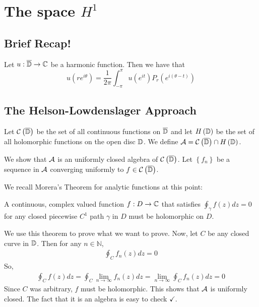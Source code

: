 \chapter{The space \texorpdfstring{$H^1$}{}}

\section{Brief Recap!}
\begin{theorem}
    Let $u : \overline{\mathbb D} \to \mathbb C$ be a harmonic function. Then we have that
    \begin{equation*}
	u\left( re^{i\theta} \right) = \frac{1}{2\pi} \int_{-\pi}^{\pi} u\left( e^{it} \right) P_{r} \left( e^{i\left( \theta-t \right)} \right)
    \end{equation*}
    \label{thm:Poisson-Integral-Formula}
\end{theorem}

\section{The Helson-Lowdenslager Approach}
Let ${\cal C} \left( \overline {\mathbb D} \right)$ be the set of all continuous functions on $\overline{\mathbb D}$ and let $H\left( \mathbb D \right)$ be the set of all holomorphic functions on the open disc $\mathbb D$. We define ${\cal A} ={\cal C} \left( \overline{ \mathbb D } \right) \cap H \left( \mathbb D \right)$.

We show that ${\cal A}$ is an uniformly closed algebra of ${\cal C} \left( \overline{ \mathbb D } \right)$. Let $\left\{ f_{n} \right\}$ be a sequence in ${\cal A}$ converging uniformly to $f\in {\cal C} \left( \overline {\mathbb D} \right)$.

We recall Morera's Theorem for analytic functions at this point:
\begin{theorem}[Morera]
    A continuous, complex valued function $f : D \to \mathbb C$ that satisfies $\oint _{\gamma} f \left( z \right) dz = 0$ for any closed piecewise $C^{1}$ path $\gamma$ in $D$ must be holomorphic on $D$.
    \label{thm:morera-analytic}
\end{theorem}

We use this theorem to prove what we want to prove. Now, let $C$ be any closed curve in $\mathbb D$. Then for any $n\in \mathbb N$,
\begin{align*}
\oint_{C}f_{n}  \left( z \right) dz = 0
\end{align*}
So, 
\begin{align*}
    \oint_{C} f(z) dz = \oint_{C} \lim_{n\to \infty} f_{n} \left( z \right) dz = \lim_{n\to \infty} \oint_{C} f_{n} \left( z \right) dz =0
\end{align*}
Since $C$ was arbitrary, $f$ must be holomorphic. This shows that ${\cal A}$ is uniformly closed. The fact that it is an algebra is easy to check $\checkmark$.


